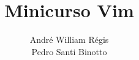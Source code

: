 \documentclass{beamer}
\title{Minicurso Vim}
\author{André William Régis \\ Pedro Santi Binotto}
\institute{UFSC}
\date{\the\year}
\begin{document}
\frame{\titlepage}




% 
% 
% 
% 

\end{document}
